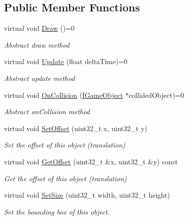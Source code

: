 \subsection*{Public Member Functions}
\begin{DoxyCompactItemize}
\item 
virtual void \hyperlink{class_i_game_object_aabf746343989a0a29543a3d6db48b6a4}{Draw} ()=0
\begin{DoxyCompactList}\small\item\em Abstract draw method \end{DoxyCompactList}\item 
virtual void \hyperlink{class_i_game_object_a4959cd2f80334cfa1a97255082e984cc}{Update} (float delta\+Time)=0
\begin{DoxyCompactList}\small\item\em Abstract update method \end{DoxyCompactList}\item 
virtual void \hyperlink{class_i_game_object_a31702eed0f78cff5e5d49717751bd39d}{On\+Collision} (\hyperlink{class_i_game_object}{I\+Game\+Object} $\ast$collided\+Object)=0
\begin{DoxyCompactList}\small\item\em Abstract on\+Collision method \end{DoxyCompactList}\item 
virtual void \hyperlink{class_i_game_object_abef2c39177245bdca445db64a1d24be8}{Set\+Offset} (uint32\+\_\+t x, uint32\+\_\+t y)
\begin{DoxyCompactList}\small\item\em Set the offset of this object (translation) \end{DoxyCompactList}\item 
virtual void \hyperlink{class_i_game_object_a133dd7afcf061416f25135e2d29412f9}{Get\+Offset} (uint32\+\_\+t \&x, uint32\+\_\+t \&y) const 
\begin{DoxyCompactList}\small\item\em Get the offset of this object (translation) \end{DoxyCompactList}\item 
virtual void \hyperlink{class_i_game_object_a1eddecf9e89fc2df118e2a801bf01875}{Set\+Size} (uint32\+\_\+t width, uint32\+\_\+t height)
\begin{DoxyCompactList}\small\item\em Set the bounding box of this object. \end{DoxyCompactList}\item 

\end{DoxyCompactItemize}
